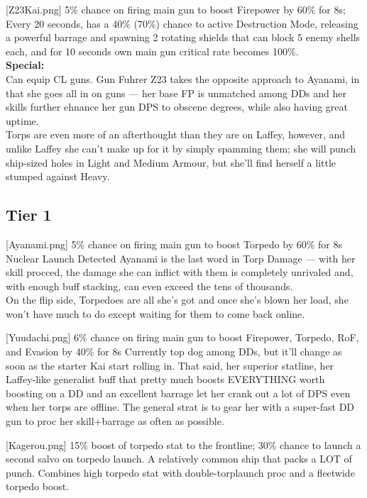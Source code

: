 [Z23Kai.png]
{5\% chance on firing main gun to boost Firepower by 60\% for 8s; Every 20 seconds, has a 40\% (70\%) chance to active Destruction Mode, releasing a powerful barrage and spawning 2 rotating shields that can block 5 enemy shells each, and for 10 seconds own main gun critical rate becomes 100\%.\\
\textbf{Special:}\\ Can equip CL guns.}
{Gun Fuhrer}
{Z23 takes the opposite approach to Ayanami, in that she goes all in on guns --- her base FP is unmatched among DDs and her skills further ehnance her gun DPS to obscene degrees, while also having great uptime.\\
Torps are even more of an afterthought than they are on Laffey, however, and unlike Laffey she can't make up for it by simply spamming them; she will punch ship-sized holes in Light and Medium Armour, but she'll find herself a little stumped against Heavy.}


\newpage
\subsection{Tier 1}
[Ayanami.png]
{5\% chance on firing main gun to boost Torpedo by 60\% for 8s}
{Nuclear Launch Detected}
{Ayanami is the last word in Torp Damage --- with her skill procced, the damage she can inflict with them is completely unrivaled and, with enough buff stacking, can even exceed the tens of thousands.\\
On the flip side, Torpedoes are all she's got and once she's blown her load, she won't have much to do except waiting for them to come back online.}

[Yuudachi.png]
{6\% chance on firing main gun to boost Firepower, Torpedo, RoF, and Evasion by 40\% for 8s}
{}
{Currently top dog among DDs, but it'll change as soon as the starter Kai start rolling in. That said, her superior statline, her Laffey-like generalist buff that pretty much boosts EVERYTHING worth boosting on a DD and an excellent barrage let her crank out a lot of DPS even when her torps are offline. The general strat is to gear her with a super-fast DD gun to proc her skill+barrage as often as possible.}

[Kagerou.png]
{15\% boost of torpedo stat to the frontline; 30\% chance to launch a second salvo on torpedo launch.}
{}
{A relatively common ship that packs a LOT of punch. Combines high torpedo stat with double-torplaunch proc and a fleetwide torpedo boost.}
 

